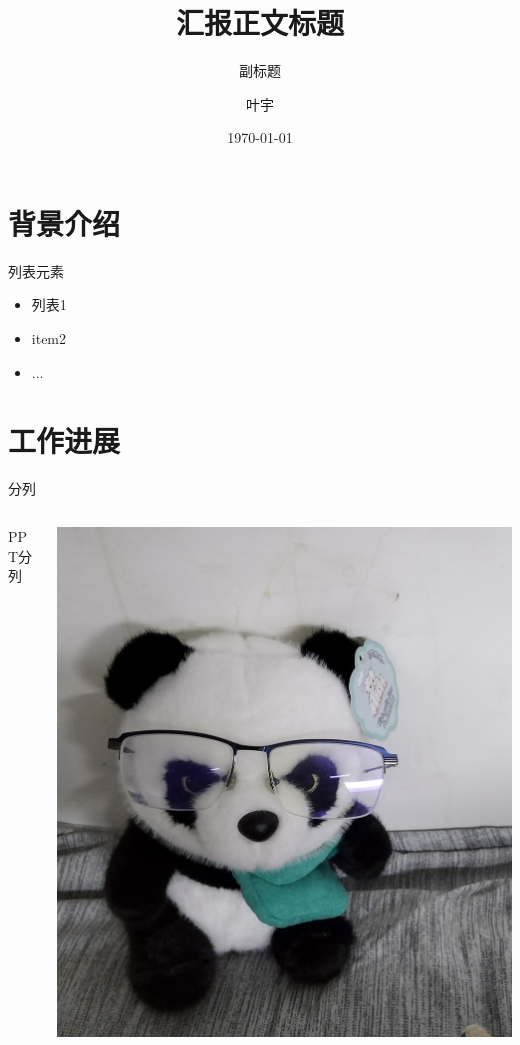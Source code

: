 \documentclass{beamer}
\begin{document}
\title{汇报正文标题}
\subtitle{副标题}
\author{叶宇}
\date{\today}

\maketitle

\section{背景介绍}
\begin{frame}{列表元素}
    \begin{itemize}
        \item 列表1
        \item item2
        \item ...
    \end{itemize}
\end{frame}

\section{工作进展}
\begin{frame}{分列}
\begin{columns}
\begin{column}{0.6\textwidth}
\centering
PPT分列
\end{column}
\begin{column}{0.4\textwidth}
    \includegraphics[width=\textwidth]{assets/test.jpg}
\end{column}
\end{columns}
\end{frame}

\backmatter
\end{document}
